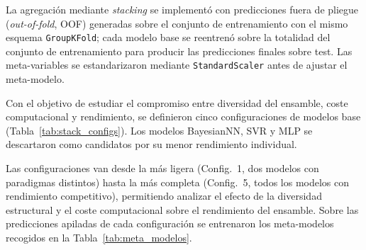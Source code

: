 La agregación mediante \textit{stacking} se implementó con predicciones fuera de pliegue (\textit{out-of-fold}, OOF) generadas sobre el conjunto de entrenamiento con el mismo esquema \texttt{GroupKFold}; cada modelo base se reentrenó sobre la totalidad del conjunto de entrenamiento para producir las predicciones finales sobre test. Las meta-variables se estandarizaron mediante \texttt{StandardScaler} antes de ajustar el meta-modelo.

Con el objetivo de estudiar el compromiso entre diversidad del ensamble, coste computacional y rendimiento, se definieron cinco configuraciones de modelos base (Tabla~\ref{tab:stack_configs}). Los modelos BayesianNN, SVR y MLP se descartaron como candidatos por su menor rendimiento individual.

\begin{table}[htbp]
  \centering
  \caption{Configuraciones de modelos base para \textit{stacking}.}
  \label{tab:stack_configs}
\end{table}

Las configuraciones van desde la más ligera (Config.~1, dos modelos con paradigmas distintos) hasta la más completa (Config.~5, todos los modelos con rendimiento competitivo), permitiendo analizar el efecto de la diversidad estructural y el coste computacional sobre el rendimiento del ensamble. Sobre las predicciones apiladas de cada configuración se entrenaron los meta-modelos recogidos en la Tabla~\ref{tab:meta_modelos}.

